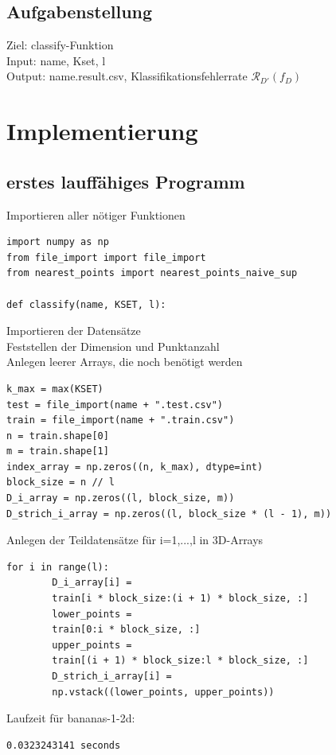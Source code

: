 \documentclass{beamer}
\begin{document}
\subsection{Aufgabenstellung}
\begin{frame}
Ziel: classify-Funktion\\
Input: name, Kset, l \\
Output: name.result.csv, Klassifikationsfehlerrate $\mathcal{R}_{D'}(f_{D})$ \\
\vspace{20 mm}
\end{frame}



\section{Implementierung}




\subsection{erstes lauffähiges Programm}

\begin{frame}[fragile]
Importieren aller nötiger Funktionen
\begin{verbatim}
import numpy as np
from file_import import file_import
from nearest_points import nearest_points_naive_sup

def classify(name, KSET, l):
\end{verbatim}
\end{frame}

\begin{frame}[fragile]
Importieren der Datensätze\\
Feststellen der Dimension und Punktanzahl\\
Anlegen leerer Arrays, die noch benötigt werden\\
\begin{verbatim}
k_max = max(KSET)
test = file_import(name + ".test.csv")  
train = file_import(name + ".train.csv")  
n = train.shape[0]  
m = train.shape[1] 
index_array = np.zeros((n, k_max), dtype=int)  
block_size = n // l  
D_i_array = np.zeros((l, block_size, m))  
D_strich_i_array = np.zeros((l, block_size * (l - 1), m))  
\end{verbatim}
\end{frame}

\begin{frame}[fragile]
Anlegen der Teildatensätze für i=1,...,l in 3D-Arrays
\begin{verbatim}
for i in range(l):
        D_i_array[i] = 
        train[i * block_size:(i + 1) * block_size, :]
        lower_points = 
        train[0:i * block_size, :]
        upper_points = 
        train[(i + 1) * block_size:l * block_size, :]
        D_strich_i_array[i] =
        np.vstack((lower_points, upper_points))
\end{verbatim}
Laufzeit für bananas-1-2d:
\begin{verbatim}
0.0323243141 seconds
\end{verbatim}
\end{frame}
\end{document}
